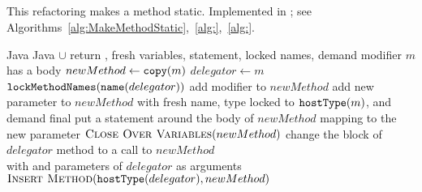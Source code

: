 \subsection{}
This refactoring makes a method static. Implemented in ; see Algorithms~\ref{alg:MakeMethodStatic},~\ref{alg:},~\ref{alg:}.

\begin{algorithm}[p]
\caption{$\refactoring{Make Method Static}(m : \type{Method})$}\label{alg:MakeMethodStatic}
\begin{algorithmic}[1]
\REQUIRE Java
\ENSURE Java $\cup$ return , fresh variables,  statement, locked names, demand  modifier
\medskip
  \STATE \assert $m$ has a body
  \STATE $newMethod\leftarrow \text{\texttt{copy}}(m)$
  \STATE $delegator\leftarrow m$
  \STATE $\text{\texttt{lockMethodNames}}(\text{\texttt{name}}(delegator))$
  \STATE add  modifier to $newMethod$
  \STATE add new parameter to $newMethod$ with fresh name, type locked to $\text{\texttt{hostType}}(m)$, and demand final
  \STATE put a  statement around the body of $newMethod$ mapping  to the new parameter
  \STATE $\textsc{Close Over Variables}(newMethod)$
  \STATE change the block of $delegator$ method to a call to $newMethod$ \\
  	with  and parameters of $delegator$ as arguments
  \STATE $\textsc{Insert Method}(\text{\texttt{hostType}}(delegator), newMethod)$
\end{algorithmic}
\end{algorithm}


